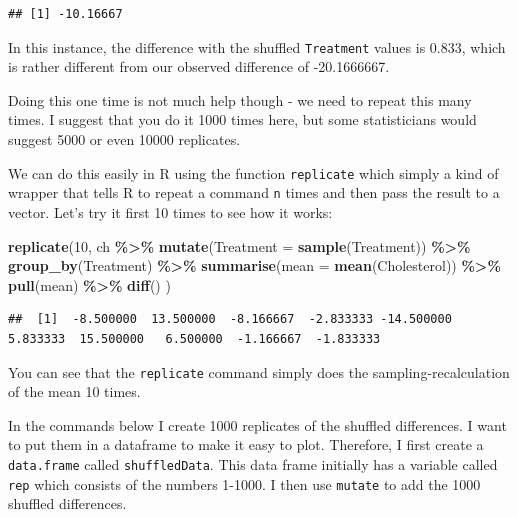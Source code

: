 \documentclass[
  a4paperpaper,
]{book}
\newenvironment{Shaded}{\begin{snugshade}}{\end{snugshade}}
\newcommand{\DataTypeTok}[1]{\textcolor[rgb]{0.13,0.29,0.53}{#1}}
\newcommand{\DecValTok}[1]{\textcolor[rgb]{0.00,0.00,0.81}{#1}}
\newcommand{\KeywordTok}[1]{\textcolor[rgb]{0.13,0.29,0.53}{\textbf{#1}}}
\newcommand{\NormalTok}[1]{#1}
\newcommand{\OperatorTok}[1]{\textcolor[rgb]{0.81,0.36,0.00}{\textbf{#1}}}
\newcommand{\StringTok}[1]{\textcolor[rgb]{0.31,0.60,0.02}{#1}}
\begin{document}
\begin{verbatim}
## [1] -10.16667
\end{verbatim}

In this instance, the difference with the shuffled \texttt{Treatment} values is 0.833, which is rather different from our observed difference of -20.1666667.

Doing this one time is not much help though - we need to repeat this many times. I suggest that you do it 1000 times here, but some statisticians would suggest 5000 or even 10000 replicates.

We can do this easily in R using the function \texttt{replicate} which simply a kind of wrapper that tells R to repeat a command \texttt{n} times and then pass the result to a vector.
Let's try it first 10 times to see how it works:

\begin{Shaded}
\begin{Highlighting}[]
\KeywordTok{replicate}\NormalTok{(}\DecValTok{10}\NormalTok{,}
\NormalTok{            ch }\OperatorTok{\%\textgreater{}\%}
\StringTok{            }\KeywordTok{mutate}\NormalTok{(}\DataTypeTok{Treatment =} \KeywordTok{sample}\NormalTok{(Treatment)) }\OperatorTok{\%\textgreater{}\%}
\StringTok{            }\KeywordTok{group\_by}\NormalTok{(Treatment) }\OperatorTok{\%\textgreater{}\%}
\StringTok{            }\KeywordTok{summarise}\NormalTok{(}\DataTypeTok{mean =} \KeywordTok{mean}\NormalTok{(Cholesterol)) }\OperatorTok{\%\textgreater{}\%}
\StringTok{            }\KeywordTok{pull}\NormalTok{(mean) }\OperatorTok{\%\textgreater{}\%}
\StringTok{            }\KeywordTok{diff}\NormalTok{()}
\NormalTok{)}
\end{Highlighting}
\end{Shaded}

\begin{verbatim}
##  [1]  -8.500000  13.500000  -8.166667  -2.833333 -14.500000   5.833333  15.500000   6.500000  -1.166667  -1.833333
\end{verbatim}

You can see that the \texttt{replicate} command simply does the sampling-recalculation of the mean 10 times.

In the commands below I create 1000 replicates of the shuffled differences. I want to put them in a dataframe to make it easy to plot. Therefore, I first create a \texttt{data.frame} called \texttt{shuffledData}. This data frame initially has a variable called \texttt{rep} which consists of the numbers 1-1000. I then use \texttt{mutate} to add the 1000 shuffled differences.
\end{document}
